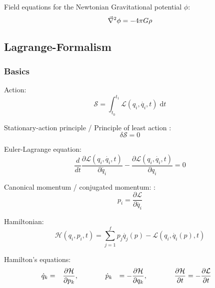 		\noindent
		Field equations for the Newtonian Gravitational potential $\phi$:
		\begin{equation}
			\vec{\nabla}^2\phi=-4\pi G\rho
		\end{equation}

	\subsection{Lagrange-Formalism}
		\subsubsection{Basics}
			\noindent
			Action:
			\begin{equation}
				\mathcal{S}=\int_{t_0}^{t_1}\mathcal{L}(q_i, \dot{q_i},t)\;\mathrm{d} t
			\end{equation}

			\noindent
			Stationary-action principle / Principle of least action :%
			\begin{equation}
				\delta \mathcal{S}=0
			\end{equation}

			\noindent
			Euler-Lagrange equation:
			\begin{equation}
				 \frac{d}{dt} \frac{\partial \mathcal{L}(q_{i},\dot{q_{i}},t)}{\partial \dot{q_{i}}} - \frac{\partial \mathcal{L}(q_{i},\dot{q_{i}},t)}{\partial q_{i}} = 0
			\end{equation}

			\noindent
			Canonical momentum / conjugated momentum: :
			\begin{equation}
				p_i=\frac{\partial \mathcal{L}}{\partial\dot{q_i}}
			\end{equation}

			\noindent
			Hamiltonian:
			\begin{equation}
				\mathcal{H}(q_i,p_i,t)=\sum_{j=1}^{f}p_j\dot{q_j}(p) - \mathcal{L}(q_i, \dot{q_i}(p),t)
			\end{equation}

			\noindent
			Hamilton's equations:
			\begin{equation}
				\begin{aligned}
					\dot{q}_k &= \phantom{-}\frac{\partial \mathcal{H}}{\partial p_k}, &&\hspace{30pt}
					\dot{p}_k &= -\frac{\partial \mathcal{H}}{\partial q_k}, &&\hspace{30pt}
					\frac{\partial \mathcal{H}}{\partial t} &= -\frac{\partial \mathcal{L}}{\partial t}
				\end{aligned}
			\end{equation}

